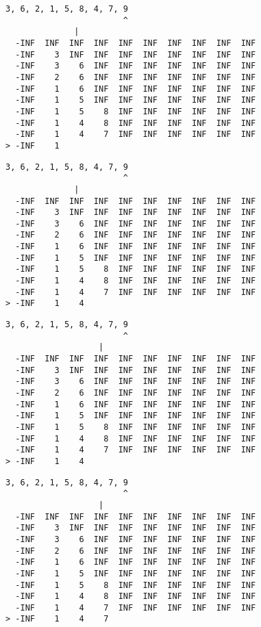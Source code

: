 { \begin{verbatim}
3, 6, 2, 1, 5, 8, 4, 7, 9
                        ^
              |
  -INF  INF  INF  INF  INF  INF  INF  INF  INF  INF
  -INF    3  INF  INF  INF  INF  INF  INF  INF  INF
  -INF    3    6  INF  INF  INF  INF  INF  INF  INF
  -INF    2    6  INF  INF  INF  INF  INF  INF  INF
  -INF    1    6  INF  INF  INF  INF  INF  INF  INF
  -INF    1    5  INF  INF  INF  INF  INF  INF  INF
  -INF    1    5    8  INF  INF  INF  INF  INF  INF
  -INF    1    4    8  INF  INF  INF  INF  INF  INF
  -INF    1    4    7  INF  INF  INF  INF  INF  INF
> -INF    1                                        
\end{verbatim} }

{ \begin{verbatim}
3, 6, 2, 1, 5, 8, 4, 7, 9
                        ^
              |
  -INF  INF  INF  INF  INF  INF  INF  INF  INF  INF
  -INF    3  INF  INF  INF  INF  INF  INF  INF  INF
  -INF    3    6  INF  INF  INF  INF  INF  INF  INF
  -INF    2    6  INF  INF  INF  INF  INF  INF  INF
  -INF    1    6  INF  INF  INF  INF  INF  INF  INF
  -INF    1    5  INF  INF  INF  INF  INF  INF  INF
  -INF    1    5    8  INF  INF  INF  INF  INF  INF
  -INF    1    4    8  INF  INF  INF  INF  INF  INF
  -INF    1    4    7  INF  INF  INF  INF  INF  INF
> -INF    1    4                                   
\end{verbatim} }

{ \begin{verbatim}
3, 6, 2, 1, 5, 8, 4, 7, 9
                        ^
                   |
  -INF  INF  INF  INF  INF  INF  INF  INF  INF  INF
  -INF    3  INF  INF  INF  INF  INF  INF  INF  INF
  -INF    3    6  INF  INF  INF  INF  INF  INF  INF
  -INF    2    6  INF  INF  INF  INF  INF  INF  INF
  -INF    1    6  INF  INF  INF  INF  INF  INF  INF
  -INF    1    5  INF  INF  INF  INF  INF  INF  INF
  -INF    1    5    8  INF  INF  INF  INF  INF  INF
  -INF    1    4    8  INF  INF  INF  INF  INF  INF
  -INF    1    4    7  INF  INF  INF  INF  INF  INF
> -INF    1    4                                   
\end{verbatim} }

{ \begin{verbatim}
3, 6, 2, 1, 5, 8, 4, 7, 9
                        ^
                   |
  -INF  INF  INF  INF  INF  INF  INF  INF  INF  INF
  -INF    3  INF  INF  INF  INF  INF  INF  INF  INF
  -INF    3    6  INF  INF  INF  INF  INF  INF  INF
  -INF    2    6  INF  INF  INF  INF  INF  INF  INF
  -INF    1    6  INF  INF  INF  INF  INF  INF  INF
  -INF    1    5  INF  INF  INF  INF  INF  INF  INF
  -INF    1    5    8  INF  INF  INF  INF  INF  INF
  -INF    1    4    8  INF  INF  INF  INF  INF  INF
  -INF    1    4    7  INF  INF  INF  INF  INF  INF
> -INF    1    4    7                              
\end{verbatim} }

